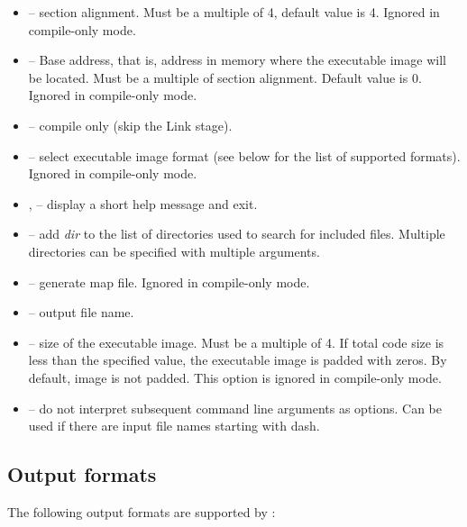 \documentclass[a4paper,12pt,twoside,extrafontsizes]{memoir}
\begin{document}
\begin{itemize}
	\item {} -- section alignment. Must be a multiple of 4, default value is 4. Ignored in compile-only mode.
	
	\item {} -- Base address, that is, address in memory where the executable image will be located. Must be a multiple of section alignment. Default value is 0. Ignored in compile-only mode.
	
	\item {} -- compile only (skip the Link stage).
	
	\item {} -- select executable image format (see below for the list of supported formats). Ignored in compile-only mode.
	
	\item {},  -- display a short help message and exit.
	
	\item {} -- add \emph{dir} to the list of directories used to search for included files. Multiple directories can be specified with multiple  arguments.
	
	\item {} -- generate map file. Ignored in compile-only mode.
	
	\item {} -- output file name.
	
	\item {} -- size of the executable image. Must be a multiple of 4. If total code size is less than the specified value, the executable image is padded with zeros. By default, image is not padded. This option is ignored in compile-only mode.
	
	\item \shellcmd{--} -- do not interpret subsequent command line arguments as options. Can be used if there are input file names starting with dash.
\end{itemize}

\subsection{Output formats}

The following output formats are supported by :
\end{document}
